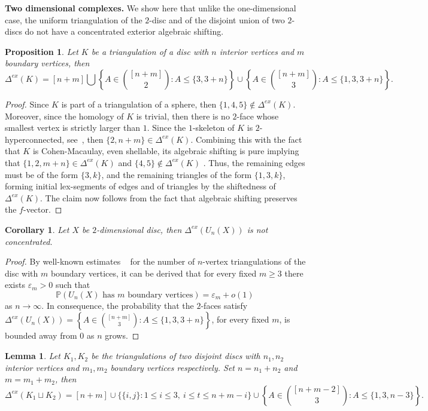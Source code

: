 \documentclass[11pt]{article}
\newtheorem{lemma}[theorem]{Lemma}
\newtheorem{proposition}[theorem]{Proposition}
\newtheorem{corollary}[theorem]{Corollary}
\numberwithin{claimcounter}{theorem}
\theoremstyle{remark}
\theoremstyle{definition}
\numberwithin{theorem}{section}
\renewcommand{\P}{\mathbb{P}}
\newcommand{\exshift}[1]{\Delta^{ex}(#1)}
\begin{document}
%
\noindent
{\bf Two dimensional complexes.}
We show here that unlike the one-dimensional case, the uniform triangulation of the $2$-disc and of the disjoint union of two $2$-discs do not have a concentrated exterior algebraic shifting.
\begin{proposition}
    \label{p:discshift}
    Let $K$ be a triangulation of a disc with $n$ interior vertices and $m$ boundary vertices, then $$\exshift{K} = [n+m] \bigcup \left \{A\in \binom{[n+m]}{2} \colon A \leq \{3,3+n\} \right \} \cup \left \{A \in \binom{[n+m]}{3} \colon A \leq \{1,3,3+n\} \right \} .$$
\end{proposition}
\begin{proof}
    Since $K$ is part of a triangulation of a sphere, then $\{1,4,5\} \notin \exshift{K}$. Moreover, since the homology of $K$ is trivial, then there is no $2$-face whose smallest vertex is strictly larger than $1$. Since the $1$-skeleton of $K$ is $2$-hyperconnected, see~\cite{kalai85-hyperconnectivity}, then $\{2,n+m\} \in \exshift{K}$. Combining this with the fact that $K$ is Cohen-Macaulay, even shellable, its algebraic shifting is pure implying that $\{1,2,m+n\}\in \exshift{K}$ and $\{4,5\}\notin \exshift{K}$ . Thus, the remaining edges must be of the form $\{3,k\}$, and the remaining triangles of the form $\{1,3,k\}$,    
    forming initial lex-segments of edges and of triangles by the shiftedness of $\exshift{K}$. The claim now follows from the fact that algebraic shifting preserves the $f$-vector.
\end{proof}
%
\begin{corollary}
    \label{c:discsconcentration}
    Let $X$ be $2$-dimensional disc, then $\exshift{U_n(X)}$ is not concentrated. 
\end{corollary}
\begin{proof}
    By well-known estimates ~\cite{Tutte1962,goulden2004combinatorial} for the number of $n$-vertex triangulations of the disc with $m$ boundary vertices, it can be derived that for every fixed $m\ge 3$ there exists $\varepsilon_m>0$ such that
    \[
    \P(U_n(X) \text{ has $m$ boundary vertices}) =\varepsilon_m +o(1)\,\]
    as $n\to \infty$. 
    In consequence, the probability that the $2$-faces satisfy $\exshift{U_n(X)} = \left \{A \in \binom{[n+m]}{3} \colon A \leq \{1,3,3+n\} \right \}$, for every fixed $m$, is bounded away from $0$ as $n$ grows.
\end{proof}
%
\begin{lemma}
    \label{c:twodiscshift}
    Let $K_1,K_2$ be the triangulations of two disjoint discs with $n_1,n_2$ interior vertices and $m_1,m_2$ boundary vertices respectively. Set $n=n_1+n_2$ and $m=m_1+m_2$, then
    $$\exshift{K_1\sqcup K_2} = [n+m] \cup \{\{i,j\}\colon 1\leq i\leq 3,~i \leq t\leq n+m-i\}\cup \left \{A\in \binom{[n+m-2]}{3}\colon A\leq \{1,3,n-3\} \right \}.$$
\end{lemma}
\end{document}
